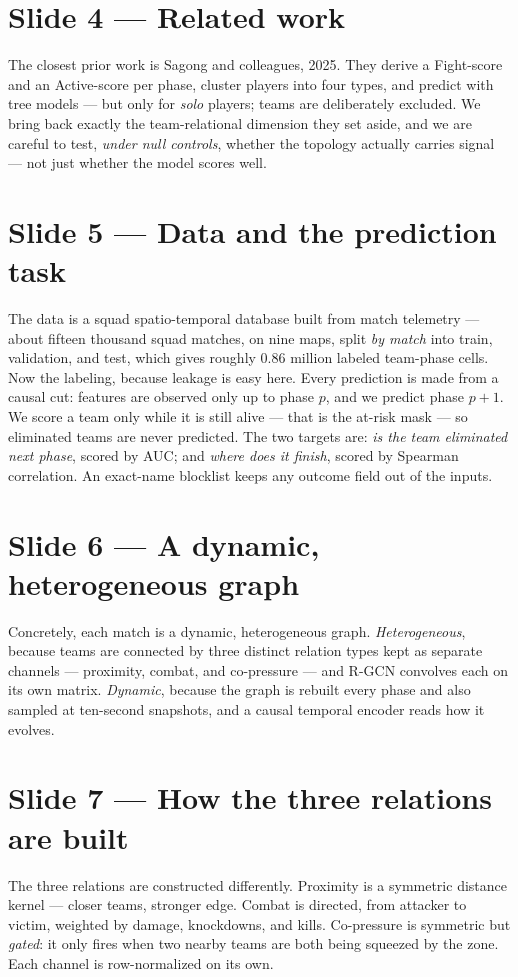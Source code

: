 \documentclass[11pt]{article}
\begin{document}
\section{Slide 4 --- Related work}
The closest prior work is Sagong and colleagues, 2025. They derive a Fight-score and an Active-score per phase, cluster players into four types, and predict with tree models --- but only for \emph{solo} players; teams are deliberately excluded. We bring back exactly the team-relational dimension they set aside, and we are careful to test, \emph{under null controls}, whether the topology actually carries signal --- not just whether the model scores well.

\section{Slide 5 --- Data and the prediction task}
The data is a squad spatio-temporal database built from match telemetry --- about fifteen thousand squad matches, on nine maps, split \emph{by match} into train, validation, and test, which gives roughly 0.86 million labeled team-phase cells. Now the labeling, because leakage is easy here. Every prediction is made from a causal cut: features are observed only up to phase $p$, and we predict phase $p\!+\!1$. We score a team only while it is still alive --- that is the at-risk mask --- so eliminated teams are never predicted. The two targets are: \emph{is the team eliminated next phase}, scored by AUC; and \emph{where does it finish}, scored by Spearman correlation. An exact-name blocklist keeps any outcome field out of the inputs.

\section{Slide 6 --- A dynamic, heterogeneous graph}
Concretely, each match is a dynamic, heterogeneous graph. \emph{Heterogeneous}, because teams are connected by three distinct relation types kept as separate channels --- proximity, combat, and co-pressure --- and R-GCN convolves each on its own matrix. \emph{Dynamic}, because the graph is rebuilt every phase and also sampled at ten-second snapshots, and a causal temporal encoder reads how it evolves.

\section{Slide 7 --- How the three relations are built}
The three relations are constructed differently. Proximity is a symmetric distance kernel --- closer teams, stronger edge. Combat is directed, from attacker to victim, weighted by damage, knockdowns, and kills. Co-pressure is symmetric but \emph{gated}: it only fires when two nearby teams are both being squeezed by the zone. Each channel is row-normalized on its own.
\end{document}
